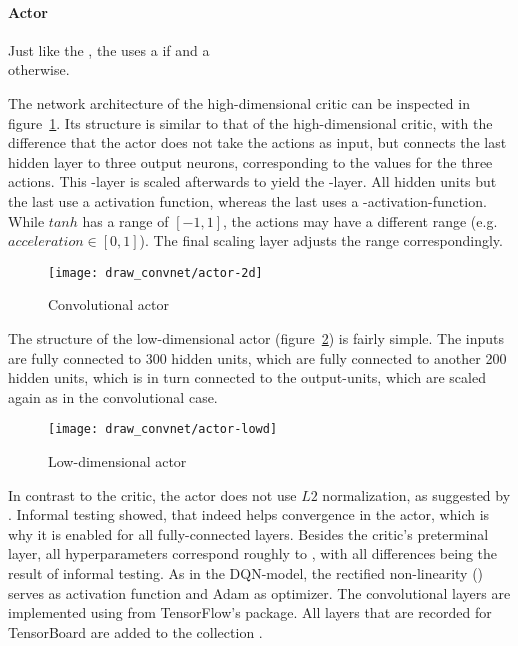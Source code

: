 \paragraph{Actor}

Just like the , the  uses a  if  and a\\  otherwise.

The network architecture of the high-dimensional critic can be inspected in figure~\ref{fig:2dact}. Its structure is similar to that of the high-dimensional critic, with the difference that the actor does not take the actions as input, but connects the last hidden layer to three output neurons, corresponding to the values for the three actions. This -layer is scaled afterwards to yield the -layer. All hidden units but the last use a  activation function, whereas the last uses a -activation-function. While $tanh$ has a range of $[-1,1]$, the actions may have a different range (e.g. $acceleration \in [0,1]$). The final scaling layer adjusts the range correspondingly.

\begin{figure}[h]
	\centering 
	\texttt{[image: draw\_convnet/actor-2d]}
	\caption{Convolutional actor}
	\label{fig:2dact}
\end{figure}

The structure of the low-dimensional actor (figure~\ref{fig:lowdact}) is fairly simple. The inputs are fully connected to 300 hidden units, which are fully connected to another 200 hidden units, which is in turn connected to the output-units, which are scaled again as in the convolutional case. 

\begin{figure}[h]
	\centering 
	\texttt{[image: draw\_convnet/actor-lowd]}
	\caption{Low-dimensional actor}
	\label{fig:lowdact}
\end{figure}

In contrast to the critic, the actor does not use $L2$ normalization, as suggested by \cite{lillicrap_continuous_2015}. Informal testing showed, that \batchnorm indeed helps convergence in the actor, which is why it is enabled for all fully-connected layers. Besides the critic's preterminal layer, all hyperparameters correspond roughly to \cite{lillicrap_continuous_2015}, with all differences being the result of informal testing. As in the DQN-model, the rectified non-linearity () serves as activation function and Adam\cite{kingma_adam:_2014} as optimizer. The convolutional layers are implemented using  from TensorFlow's  package. All layers that are recorded for TensorBoard are added to the collection .

